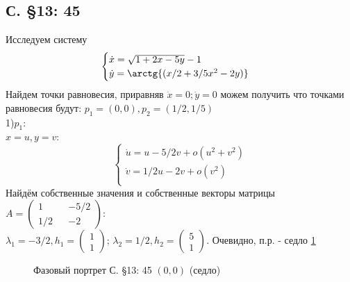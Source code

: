 \documentclass{article}
\begin{document}
\subsection{С. \S13: 45}
Исследуем систему 
\begin{equation}
\begin{cases}
        \dot{x}=\sqrt{1+2x-5y}-1\\
        \dot{y}=\arctg{(x/2+3/5x^2-2y)}\\
    \end{cases}    
\end{equation}
Найдем точки равновесия, приравняв $\dot{x}=0; \dot{y}=0$ можем получить что точками равновесия будут: $p_1=(0,0), p_2=(1/2,1/5)$\\

1)$p_1$:\\
$x=u,y=v$:
\begin{equation}
\begin{cases}
        \dot{u}=u-5/2v+o(u^2+v^2)\\
        \dot{v}=1/2u-2v+o(v^2)\\
    \end{cases}    
\end{equation}
Найдём собственные значения и собственные векторы матрицы $A=\begin{pmatrix} 1 && -5/2 \\ 1/2 && -2 \end{pmatrix}$:\\
 $\lambda_1=-3/2,
 h_1 = \begin{pmatrix} 1 \\  1 \end{pmatrix} $; 
 $\lambda_2= 1/2,
 h_2 = \begin{pmatrix} 5 \\  1 \end{pmatrix} $. 
 Очевидно, п.р. - седло \ref{13.45.1}
 \begin{figure}[ht]
\caption{Фазовый портрет С. \S13: 45 $(0,0)$ (седло)}
\label{13.45.1}
\end{figure}\\ 
\end{document}
